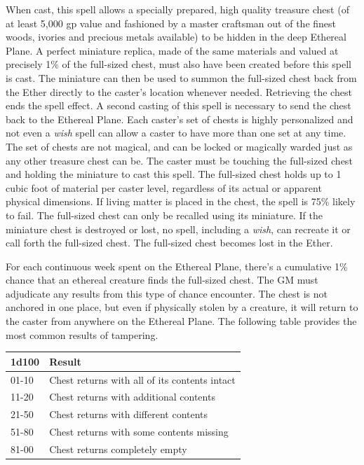 \begin{multicols}{2}
When cast, this spell allows a specially prepared, high quality treasure chest (of at least 5,000 gp value and fashioned by a master craftsman out of the finest woods, ivories and precious metals available) to be hidden in the deep Ethereal Plane.  A perfect miniature replica, made of the same materials and valued at precisely 1\% of the full-sized chest, must also have been created before this spell is cast.  The miniature can then be used to summon the full-sized chest back from the Ether directly to the caster's location whenever needed.  Retrieving the chest ends the spell effect.  A second casting of this spell is necessary to send the chest back to the Ethereal Plane.  Each caster's set of chests is highly personalized and not even a \textit{wish} spell can allow a caster to have more than one set at any time.  The set of chests are not magical, and can be locked or magically warded just as any other treasure chest can be.  The caster must be touching the full-sized chest and holding the miniature to cast this spell.  The full-sized chest holds up to 1 cubic foot of material per caster level, regardless of its actual or apparent physical dimensions.  If living matter is placed in the chest, the spell is 75\% likely to fail.  The full-sized chest can only be recalled using its miniature.  If the miniature chest is destroyed or lost, no spell, including a \textit{wish}, can recreate it or call forth the full-sized chest.  The full-sized chest becomes lost in the Ether.  

For each continuous week spent on the Ethereal Plane, there's a cumulative 1\% chance that an ethereal creature finds the full-sized chest.  The GM must adjudicate any results from this type of chance encounter.  The chest is not anchored in one place, but even if physically stolen by a creature, it will return to the caster from anywhere on the Ethereal Plane.  The following table provides the most common results of tampering.

\noindent
\begin{tabular}{|p{}|p{}|}
\hline
1d100	& Result \\
\hline\hline
\rowcolor[gray]{.9}01-10	& Chest returns with all of its contents intact \\
11-20	& Chest returns with additional contents \\
\rowcolor[gray]{.9}21-50	& Chest returns with different contents  \\
51-80	& Chest returns with some contents missing \\
\rowcolor[gray]{.9}81-00	& Chest returns completely empty \\
\hline
\end{tabular}


\end{multicols}
